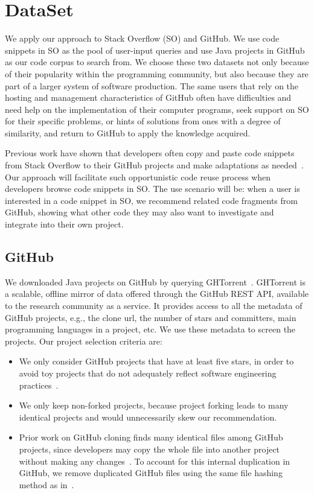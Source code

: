 \section{DataSet}
\label{sec:dataset}
We apply our approach to Stack Overflow (SO) and GitHub. We use code snippets in SO as the pool of user-input queries and use Java projects in GitHub as our code corpus to search from. We choose these two datasets not only because of their popularity within the programming community, but also because they are part of a larger system of software production. The same users that rely on the hosting and management characteristics of GitHub often have difficulties and need help on the implementation of their computer programs, seek support on SO for their specific problems, or hints of solutions from ones with a degree of similarity, and return to GitHub to apply the knowledge acquired. 

Previous work have shown that developers often copy and paste code snippets from Stack Overflow to their GitHub projects and make adaptations as needed~\cite{yang2017stack, an2017stack, wu2018developers, zhang2019analyzing}. Our approach will facilitate such opportunistic code reuse process when developers browse code snippets in SO. The use scenario will be: when a user is interested in a code snippet in SO, we recommend related code fragments from GitHub, showing what other code they may also want to investigate and integrate into their own project. 


\subsection{GitHub}
We downloaded Java projects on GitHub by querying GHTorrent~\cite{gousios2012ghtorrent}. GHTorrent is a scalable, offline mirror of data offered through the GitHub REST API, available to the research community as a service. It provides access to all the metadata of GitHub projects, e.g., the clone url, the number of stars and committers, main programming languages in a project, etc. We use these metadata to screen the projects. Our project selection criteria are:
\begin{itemize}
	\item We only consider GitHub projects that have at least five stars, in order to avoid toy projects that do not adequately reflect software engineering practices~\cite{kalliamvakou2014promises}.
	\item We only keep non-forked projects, because project forking leads to many identical projects and would unnecessarily skew our recommendation.
	\item Prior work on GitHub cloning finds many identical files among GitHub projects, since developers may copy the whole file into another project without making any changes~\cite{lopes2017dejavu}. To account for this internal duplication in GitHub, we remove duplicated GitHub files using the same file hashing method as in~\cite{lopes2017dejavu}.
\end{itemize} 

